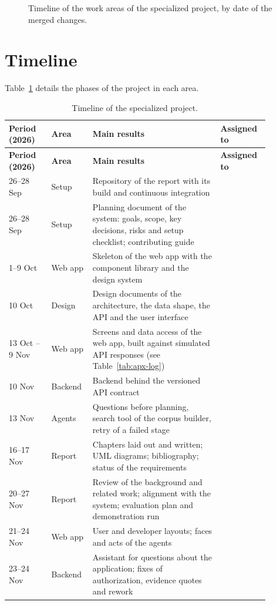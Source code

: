 \begin{appendices}
\begin{figure}[H]
    \centering
    \resizebox{\linewidth}{!}{}
    \caption{Timeline of the work areas of the specialized project, by date of the merged changes.}
    \label{fig:apx-gantt}
\end{figure}

\section{Timeline}
\label{apx:pm-timeline}
Table~\ref{tab:apx-timeline} details the phases of the project in each area.

\begingroup{}
\begin{longtable}{|p{0.15\linewidth}|p{0.12\linewidth}|p{0.45\linewidth}|p{0.16\linewidth}|}
    \caption{Timeline of the specialized project.}
    \label{tab:apx-timeline} \\
    \hline
    \textbf{Period (2026)} & \textbf{Area} & \textbf{Main results} & \textbf{Assigned to} \\
    \hline
    \endfirsthead
    \hline
    \textbf{Period (2026)} & \textbf{Area} & \textbf{Main results} & \textbf{Assigned to} \\
    \hline
    \endhead
    26--28 Sep & Setup & Repository of the report with its build and continuous integration & \\ \hline
    26--28 Sep & Setup & Planning document of the system: goals, scope, key decisions, risks and setup checklist; contributing guide & \\ \hline
    1--9 Oct & Web app & Skeleton of the web app with the component library and the design system & \\ \hline
    10 Oct & Design & Design documents of the architecture, the data shape, the API and the user interface & \\ \hline
    13 Oct -- 9 Nov & Web app & Screens and data access of the web app, built against simulated API responses (see Table~\ref{tab:apx-log}) & \\ \hline
    10 Nov & Backend & Backend behind the versioned API contract & \\ \hline
    13 Nov & Agents & Questions before planning, search tool of the corpus builder, retry of a failed stage & \\ \hline
    16--17 Nov & Report & Chapters laid out and written; UML diagrams; bibliography; status of the requirements & \\ \hline
    20--27 Nov & Report & Review of the background and related work; alignment with the system; evaluation plan and demonstration run & \\ \hline
    21--24 Nov & Web app & User and developer layouts; faces and acts of the agents & \\ \hline
    23--24 Nov & Backend & Assistant for questions about the application; fixes of authorization, evidence quotes and rework & \\ \hline
\end{longtable}
\endgroup


\end{appendices}
